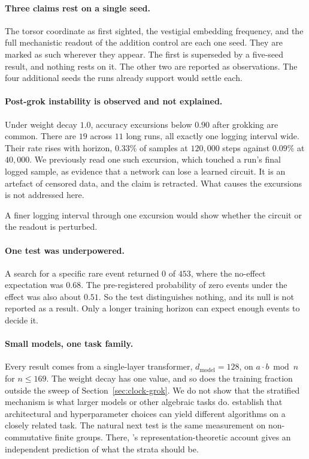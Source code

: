 \paragraph{Three claims rest on a single seed.} The torsor coordinate as first sighted, the
vestigial embedding frequency, and the full mechanistic readout of the addition control are
each one seed. They are marked as such wherever they appear. The first is superseded by a
five-seed result, and nothing rests on it. The other two are reported as observations. The four
additional seeds the runs already support would settle each.

\paragraph{Post-grok instability is observed and not explained.} Under weight decay $1.0$,
accuracy excursions below $0.90$ after grokking are common. There are $19$ across $11$ long
runs, all exactly one logging interval wide. Their rate rises with horizon, $0.33\%$ of
samples at $120{,}000$ steps against $0.09\%$ at $40{,}000$. We previously read one such
excursion, which touched a run's final logged sample, as evidence that a network can lose a
learned circuit. It is an artefact of censored data, and the claim is retracted. What causes the
excursions is not addressed here.

A finer logging interval through one excursion would show whether the circuit or the readout
is perturbed.

\paragraph{One test was underpowered.} A search for a specific rare event returned $0$ of
$453$, where the no-effect expectation was $0.68$. The pre-registered probability of zero
events under the effect was also about $0.51$. So the test distinguishes nothing, and its null
is not reported as a result. Only a longer training horizon can expect enough events to decide
it.

\paragraph{Small models, one task family.} Every result comes from a single-layer
transformer, $d_{\text{model}} = 128$, on $a \cdot b \bmod n$ for $n \le 169$. The weight decay
has one value, and so does the training fraction outside the sweep of
Section~\ref{sec:clock-grok}. We do not show that the stratified mechanism is what larger
models or other algebraic tasks do. \citet{zhong2023clock} establish that architectural and
hyperparameter choices can yield different algorithms on a closely related task. The natural
next test is the same measurement on non-commutative finite groups. There,
\citet{chughtai2023toy}'s representation-theoretic account gives an independent prediction of
what the strata should be.

